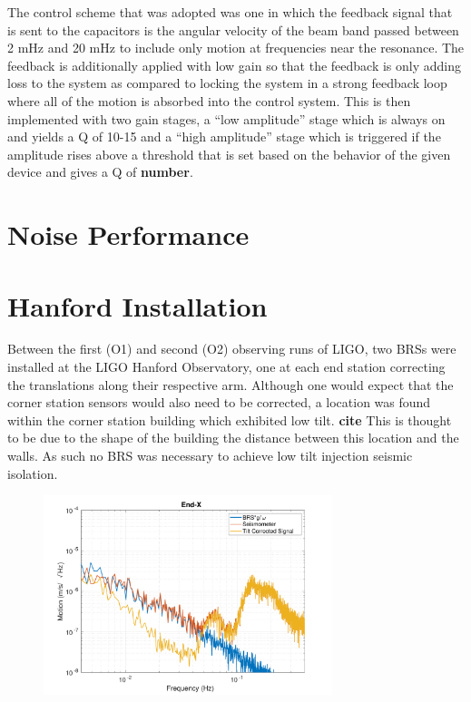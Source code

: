 \documentclass [12pt, proquest]{uwthesis}[2019]
\begin{document}
The control scheme that was adopted was one in which the feedback signal that is sent to the capacitors is the angular velocity of the beam band passed between 2 mHz and 20 mHz to include only motion at frequencies near the resonance. The feedback is additionally applied with low gain so that the feedback is only adding loss to the system as compared to locking the system in a strong feedback loop where all of the motion is absorbed into the control system. This is then implemented with two gain stages, a ``low amplitude'' stage which is always on and yields a Q of 10-15 and a ``high amplitude'' stage which is triggered if the amplitude rises above a threshold that is set based on the behavior of the given device and gives a Q of \textbf{number}.

\section{Noise Performance}
\section{Hanford Installation} \label{BRS_Hanford}

\quad Between the first (O1) and second (O2) observing runs of LIGO, two BRSs were installed at the LIGO Hanford Observatory, one at each end station correcting the translations along their respective arm. Although one would expect that the corner station sensors would also need to be corrected, a location was found within the corner station building which exhibited low tilt. \textbf{cite} This is thought to be due to the shape of the building the distance between this location and the walls. As such no BRS was necessary to achieve low tilt injection seismic isolation.

\begin{figure}%
\begin{center}
\includegraphics[width=0.75\textwidth]{HSubtractionETMX.pdf}
\caption{}
\label{sub}
\end{center}
\end{figure}
\end{document}
